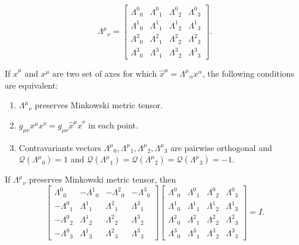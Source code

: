 \documentclass[main.tex]{subfiles}
\begin{document}
\begin{equation}
{\Lambda^\mu}_\nu =
    \begin{bmatrix}
    {\Lambda^0}_0 & {\Lambda^0}_1 & {\Lambda^0}_2 & {\Lambda^0}_3 \\
    {\Lambda^1}_0 & {\Lambda^1}_1 & {\Lambda^1}_2 & {\Lambda^1}_3 \\
    {\Lambda^2}_0 & {\Lambda^2}_1 & {\Lambda^2}_2 & {\Lambda^2}_3 \\
    {\Lambda^3}_0 & {\Lambda^3}_1 & {\Lambda^3}_2 & {\Lambda^3}_3
\end{bmatrix}.
\end{equation}
\begin{proposition}
\label{lorentz_char}
If  $\hat{x}^\mu$ and $x^\mu$ are two set of axes for which $\hat{x}^\mu = {\Lambda^\mu}_\alpha x^\alpha$, the following conditions are equivalent:
\begin{enumerate}
\item  ${\Lambda^\mu}_\nu$ preserves Minkowski metric tensor.
\item $g_{\mu\nu} x^\mu x^\nu = g_{\mu\nu} \hat{x}^\mu \hat{x}^\nu$ in each point.
\item Contravariants vectors ${\Lambda^\mu}_0, {\Lambda^\mu}_1, {\Lambda^\mu}_2, {\Lambda^\mu}_3$ are pairwise orthogonal and $\mathcal{Q}({\Lambda^\mu}_0) = 1$ and $\mathcal{Q}({\Lambda^\mu}_1)= \mathcal{Q}({\Lambda^\mu}_2) = \mathcal{Q}({\Lambda^\mu}_3) = -1.$
\end{enumerate}


\end{proposition}
\begin{proposition}
If ${\Lambda^\mu}_\nu$ preserves Minkowski metric tensor, then
\begin{equation}
 \begin{bmatrix}
    {\Lambda^0}_0 & -{\Lambda^1}_0 & -{\Lambda^2}_0 & -{\Lambda^3}_0 \\
    -{\Lambda^0}_1 & {\Lambda^1}_1 & {\Lambda^2}_1 & {\Lambda^3}_1 \\
    -{\Lambda^0}_2 & {\Lambda^1}_2 & {\Lambda^2}_2 & {\Lambda^3}_2 \\
    -{\Lambda^0}_3 & {\Lambda^1}_3 & {\Lambda^2}_3 & {\Lambda^3}_3
\end{bmatrix}
 \begin{bmatrix}
    {\Lambda^0}_0 & {\Lambda^0}_1 & {\Lambda^0}_2 & {\Lambda^0}_3 \\
    {\Lambda^1}_0 & {\Lambda^1}_1 & {\Lambda^1}_2 & {\Lambda^1}_3 \\
    {\Lambda^2}_0 & {\Lambda^2}_1 & {\Lambda^2}_2 & {\Lambda^2}_3 \\
    {\Lambda^3}_0 & {\Lambda^3}_1 & {\Lambda^3}_2 & {\Lambda^3}_3
\end{bmatrix} = I.
\end{equation}
\end{proposition}
\end{document}

